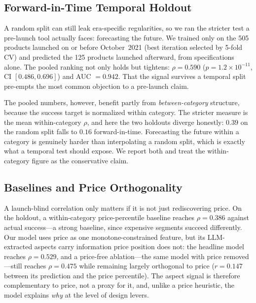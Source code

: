 \documentclass[journal]{IEEEtran}
\begin{document}
\subsection{Forward-in-Time Temporal Holdout}
A random split can still leak era-specific regularities, so we ran the stricter test a pre-launch tool actually faces: forecasting the future. We trained only on the 505 products launched on or before October~2021 (best iteration selected by 5-fold CV) and predicted the 125 products launched afterward, from specifications alone. The pooled ranking not only holds but tightens: $\rho = 0.590$ ($p = 1.2\times10^{-11}$, CI $[0.486, 0.696]$) and AUC $= 0.942$. That the signal survives a temporal split pre-empts the most common objection to a pre-launch claim.

The pooled numbers, however, benefit partly from \emph{between-category} structure, because the success target is normalized within category. The stricter measure is the mean within-category $\rho$, and here the two holdouts diverge honestly: $0.39$ on the random split falls to $0.16$ forward-in-time. Forecasting the future within a category is genuinely harder than interpolating a random split, which is exactly what a temporal test should expose. We report both and treat the within-category figure as the conservative claim.

\subsection{Baselines and Price Orthogonality}
A launch-blind correlation only matters if it is not just rediscovering price. On the holdout, a within-category price-percentile baseline reaches $\rho = 0.386$ against actual success---a strong baseline, since expensive segments succeed differently. Our model uses price as one monotone-constrained feature, but its LLM-extracted aspects carry information price position does not: the headline model reaches $\rho = 0.529$, and a price-free ablation---the same model with price removed---still reaches $\rho = 0.475$ while remaining largely orthogonal to price ($r = 0.147$ between its prediction and the price percentile). The aspect signal is therefore complementary to price, not a proxy for it, and, unlike a price heuristic, the model explains \emph{why} at the level of design levers.
\end{document}
